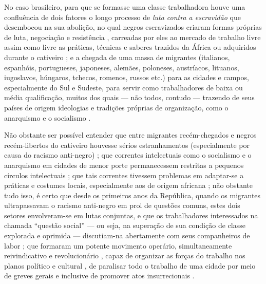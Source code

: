 No caso brasileiro, para que se formasse uma classe trabalhadora houve uma confluência de dois fatores \cite[p.~27]{chalhoub_botequim_1986} o longo processo de \textit{luta contra a escravidão} que desembocou na sua abolição, no qual negros escravizados criaram formas próprias de luta, negociação e resistência \cite{AZEVEDO2004, bethell_trafico_2002, chalhoub_liberdade_1990, conrad_ultimosanos_1978, farias_cidadesnegras_2006, fraga_encruzilhadas_2014, luna_lutaescravidao_1976, reis_elitemovsoc_1976, REISSILVA1989, REIS2004males, reis_familiareal_2008, schwartz_1814_1996, silva2007caminhos}, carreadas por eles ao mercado de trabalho livre assim como livre as práticas, técnicas e saberes trazidos da África ou adquiridos durante o cativeiro \cite{fraga_encruzilhadas_2014, souza_trabalholivre_2011, REIS2012}; e a chegada de uma massa de migrantes (italianos, espanhóis, portugueses, japoneses, alemães, poloneses, austríacos, lituanos, iugoslavos, húngaros, tchecos, romenos, russos etc.) para as cidades e campos, especialmente do Sul e Sudeste, para servir como trabalhadores de baixa ou média qualificação, muitos dos quais --- não todos, contudo --- trazendo de seus países de origem ideologias e tradições próprias de organização, como o anarquismo e o socialismo \cite{petrone_imigra_1977}.

Não obstante ser possível entender que entre migrantes recém-chegados e negros recém-libertos do cativeiro houvesse sérios estranhamentos (especialmente por causa do racismo anti-negro) \cite[pp.~35-76]{chalhoub_botequim_1986}; que correntes intelectuais como o socialismo e o anarquismo em cidades de menor porte permanecessem restritas a pequenos círculos intelectuais \cite{duarte_rebelde_1991}; que tais correntes tivessem problemas em adaptar-se a práticas e costumes locais, especialmente aos de origem africana \cite{goes_formacao_1988}; não obstante tudo isso, é certo que desde os primeiros anos da República, quando os migrantes ultrapassavam o racismo anti-negro em prol de questões comuns, estes dois setores envolveram-se em lutas conjuntas, e que os trabalhadores interessados na chamada ``questão social'' --- ou seja, na superação de sua condição de classe explorada e oprimida --- discutiam-na abertamente com seus companheiros de labor \cite[p.~73-85]{gomes_velhos_1988}; que formaram um potente movimento operário, simultaneamente reivindicativo e revolucionário \cite{samis_anabras_2004}, capaz de organizar as forças do trabalho nos planos político e cultural \cite{farinha_federa_2002,hardman_patripatr_2002}, de paralisar todo o trabalho de uma cidade por meio de greves gerais \cite{castellucci_salvador_2001,magnani_anarsp_1982} e inclusive de promover atos insurrecionais \cite{dulles_anacombras_1977,koval_prolbras_1982}.  

